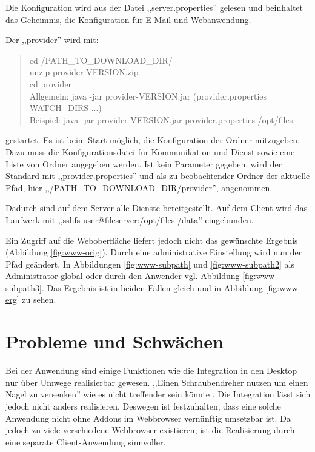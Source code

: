 \documentclass[oneside, ngerman, toc=bibliography,bibliography=totoc,listof=entryprefix, open=right,numbers=noenddot,fontsize=12pt]{scrbook}
\begin{document}
Die Konfiguration wird aus der Datei ,,server.properties'' gelesen und beinhaltet das Geheimnis, die Konfiguration für E-Mail und Webanwendung.

\bigskip

Der ,,provider'' wird mit:
\begin{quote}
    
    cd /PATH\_TO\_DOWNLOAD\_DIR/ \\
    unzip provider-VERSION.zip \\
    cd provider \\
    Allgemein: java -jar provider-VERSION.jar (provider.properties WATCH\_DIRS ...)\\
    Beispiel: java -jar provider-VERSION.jar provider.properties /opt/files
\end{quote}

gestartet. Es ist beim Start möglich, die Konfiguration der Ordner mitzugeben. Dazu muss die Konfigurationsdatei für Kommunikation und Dienst sowie eine Liste von Ordner angegeben werden. Ist kein Parameter gegeben, wird der Standard mit ,,provider.properties'' und als zu beobachtender Ordner der aktuelle Pfad, hier ,,/PATH\_TO\_DOWNLOAD\_DIR/provider'', angenommen.


Dadurch sind auf dem Server alle Dienste bereitgestellt. Auf dem Client wird das Laufwerk mit ,,sshfs user@fileserver:/opt/files /data'' eingebunden.

Ein Zugriff auf die Weboberfläche liefert jedoch nicht das gewünschte Ergebnis (Abbildung \ref{fig:www-orig}). Durch eine administrative Einstellung wird nun der Pfad geändert. In Abbildungen \ref{fig:www-subpath} und \ref{fig:www-subpath2} als Administrator global oder durch den Anwender vgl. Abbildung \ref{fig:www-subpath3}. Das Ergebnis ist in beiden Fällen gleich und in Abbildung \ref{fig:www-erg} zu sehen.



\section{Probleme und Schwächen}

Bei der Anwendung sind einige Funktionen wie die Integration in den Desktop nur über Umwege realisierbar gewesen.
,,Einen Schraubendreher nutzen um einen Nagel zu versenken'' wie es nicht treffender sein könnte \cite{cederholm2009web}. Die Integration lässt sich jedoch nicht anders realisieren. Deswegen ist festzuhalten, dass eine solche Anwendung nicht ohne Addons im Webbrowser vernünftig umsetzbar ist. Da jedoch zu viele verschiedene Webbrowser existieren, ist die Realisierung durch eine separate Client-Anwendung sinnvoller.
\end{document}
